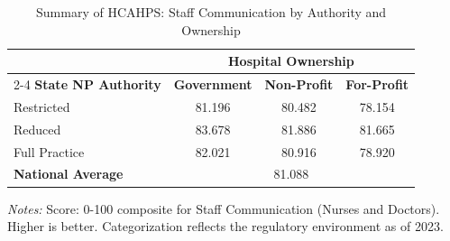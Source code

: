 \begin{table}[htbp]
    \centering
    \caption{Summary of HCAHPS: Staff Communication by Authority and Ownership}
    \label{tab:hcahps_grp1_own}
    \vspace{0.2cm}
    \begin{tabular}{lccc}
        \toprule
        & \multicolumn{3}{c}{\textbf{Hospital Ownership}} \\
        \cmidrule(lr){2-4}
        \textbf{State NP Authority} & \textbf{Government} & \textbf{Non-Profit} & \textbf{For-Profit} \\
        \midrule
        Restricted & 81.196 & 80.482 & 78.154 \\
        Reduced & 83.678 & 81.886 & 81.665 \\
        Full Practice & 82.021 & 80.916 & 78.920 \\
        \midrule
        \textbf{National Average} & \multicolumn{3}{c}{81.088} \\
        \bottomrule
    \end{tabular}
    \vspace{0.1cm}
    \begin{minipage}{0.85\textwidth}
        \footnotesize \textit{Notes:} Score: 0-100 composite for Staff Communication (Nurses and Doctors). Higher is better. Categorization reflects the regulatory environment as of 2023.
    \end{minipage}
\end{table}